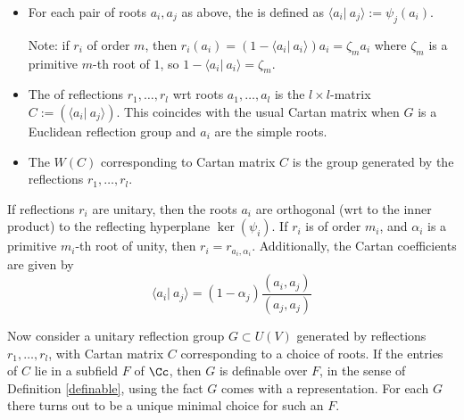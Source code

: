 \begin{definition}
\begin{itemize}
  \item For each pair of roots $a_i,a_j$ as above, the  is defined as $\langle a_i |\ a_j \rangle:=\psi_j(a_i)$.\bb
  
  Note: if $r_i$ of order $m$, then $r_i(a_i)=(1-\langle a_i|\ a_i\rangle)a_i=\zeta_m a_i$ where $\zeta_m$ is a primitive $m$-th root of $1$, so $1-\langle a_i|\ a_i\rangle=\zeta_m$.

  \item The  of reflections $r_1,\dots,r_l$ wrt roots $a_1,\dots,a_l$ is the $l\times l$-matrix $C:=(\langle a_i|\ a_j\rangle)$. This coincides with the usual Cartan matrix when $G$ is a Euclidean reflection group and $a_i$ are the simple roots.
  
  \item The  $W(C)$ corresponding to Cartan matrix $C$ is the group generated by the reflections $r_1,\dots,r_l$.
\end{itemize}
\end{definition}

\nt If reflections $r_i$ are unitary, then the roots $a_i$ are orthogonal (wrt to the inner product) to the reflecting hyperplane $\ker(\psi_i)$. If $r_i$ is of order $m_i$, and $\alpha_i$ is a primitive $m_i$-th root of unity, then $r_i=r_{a_i,\alpha_i}$. Additionally, the Cartan coefficients are given by
$$\langle a_i|\ a_j\rangle =(1-\alpha_j)\frac{(a_i,a_j)}{(a_j,a_j)}$$

\nt Now consider a unitary reflection group $G\subset U(V)$ generated by reflections $r_1,\dots,r_l$, with Cartan matrix $C$ corresponding to a choice of roots. If the entries of $C$ lie in a subfield $F$ of $\Cc$, then $G$ is definable over $F$, in the sense of Definition \ref{definable}, using the fact $G$ comes with a representation. For each $G$ there turns out to be a unique minimal choice for such an $F$.

